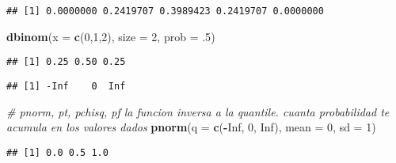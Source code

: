 \documentclass[]{book}
\newenvironment{Shaded}{\begin{snugshade}}{\end{snugshade}}
\newcommand{\CommentTok}[1]{\textcolor[rgb]{0.56,0.35,0.01}{\textit{#1}}}
\newcommand{\DataTypeTok}[1]{\textcolor[rgb]{0.13,0.29,0.53}{#1}}
\newcommand{\DecValTok}[1]{\textcolor[rgb]{0.00,0.00,0.81}{#1}}
\newcommand{\FloatTok}[1]{\textcolor[rgb]{0.00,0.00,0.81}{#1}}
\newcommand{\KeywordTok}[1]{\textcolor[rgb]{0.13,0.29,0.53}{\textbf{#1}}}
\newcommand{\NormalTok}[1]{#1}
\newcommand{\OperatorTok}[1]{\textcolor[rgb]{0.81,0.36,0.00}{\textbf{#1}}}
\newcommand{\OtherTok}[1]{\textcolor[rgb]{0.56,0.35,0.01}{#1}}
\begin{document}
\begin{verbatim}
## [1] 0.0000000 0.2419707 0.3989423 0.2419707 0.0000000
\end{verbatim}

\begin{Shaded}
\begin{Highlighting}[]
\KeywordTok{dbinom}\NormalTok{(}\DataTypeTok{x =} \KeywordTok{c}\NormalTok{(}\DecValTok{0}\NormalTok{,}\DecValTok{1}\NormalTok{,}\DecValTok{2}\NormalTok{), }\DataTypeTok{size =} \DecValTok{2}\NormalTok{, }\DataTypeTok{prob =} \FloatTok{.5}\NormalTok{)}
\end{Highlighting}
\end{Shaded}

\begin{verbatim}
## [1] 0.25 0.50 0.25
\end{verbatim}

\begin{Shaded}
\end{Shaded}

\begin{verbatim}
## [1] -Inf    0  Inf
\end{verbatim}

\begin{Shaded}
\begin{Highlighting}[]
\CommentTok{# pnorm, pt, pchisq, pf la funcion inversa a la quantile. cuanta probabilidad te acumula en los valores dados}
\KeywordTok{pnorm}\NormalTok{(}\DataTypeTok{q =} \KeywordTok{c}\NormalTok{(}\OperatorTok{-}\OtherTok{Inf}\NormalTok{, }\DecValTok{0}\NormalTok{, }\OtherTok{Inf}\NormalTok{), }\DataTypeTok{mean =} \DecValTok{0}\NormalTok{, }\DataTypeTok{sd =} \DecValTok{1}\NormalTok{)}
\end{Highlighting}
\end{Shaded}

\begin{verbatim}
## [1] 0.0 0.5 1.0
\end{verbatim}
\end{document}
